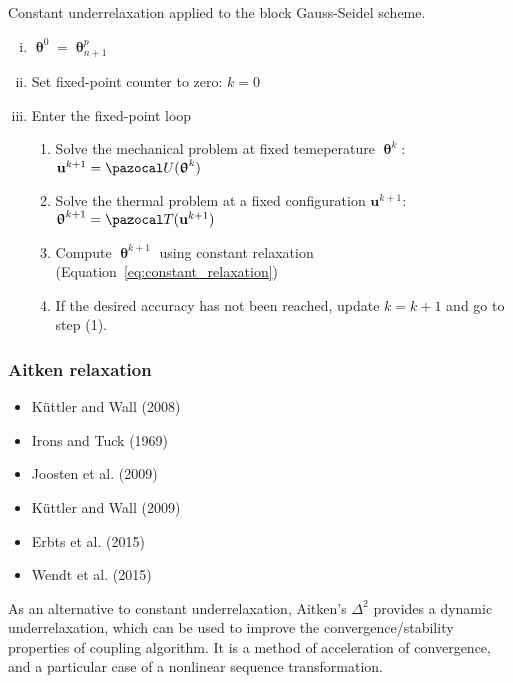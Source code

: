 \begin{framedbox}[htb]
  \caption{Constant underrelaxation applied to the block Gauss-Seidel scheme.}
  \label{box:constant_underrelaxation}
  \begin{center}
    \begin{minipage}{0.9\textwidth}
    \begin{enumerate}[(i)]
    \item \(\bm\uptheta^0 = \bm\uptheta_{n+1}^p\)
    \item Set fixed-point counter to zero: \(k=0\)
    \item Enter the fixed-point loop
    \begin{enumerate}[(1)]
      \item Solve the mechanical problem at fixed temeperature \(\bm \uptheta^k\): \(\mathbf u^{k+1} = \pazocal U(\bm \uptheta^k)\)
      \item Solve the thermal problem at a fixed configuration \(\mathbf u^{k+1}\): \(\bm \uptheta^{k+1} = \pazocal T(\mathbf u^{k+1})\)
      \item Compute \(\bm \uptheta^{k+1}\) using constant relaxation (Equation~\eqref{eq:constant_relaxation})
      \item If the desired accuracy has not been reached, update \(k=k+1\) and go to step (1).
    \end{enumerate}
    \end{enumerate}
    \end{minipage}
  \end{center}
\end{framedbox}

\subsubsection{Aitken relaxation}

\begin{itemize}
  \item Küttler and Wall (2008)
  \item Irons and Tuck (1969)
  \item Joosten et al. (2009)
  \item Küttler and Wall (2009)
  \item Erbts et al. (2015)
  \item Wendt et al. (2015)
\end{itemize}

As an alternative to constant underrelaxation, Aitken's \(\Delta^2\) provides a dynamic underrelaxation, which can be used to improve the convergence/stability properties of coupling algorithm.
It is a method of acceleration of convergence, and a particular case of a nonlinear sequence transformation.

